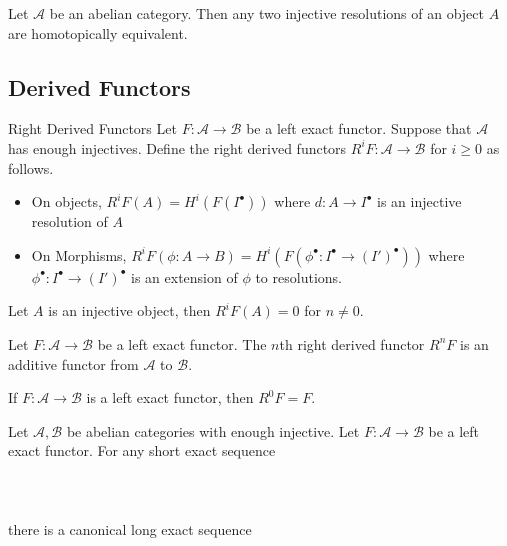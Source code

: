 \documentclass[a4paper]{article}
\begin{document}
\begin{lmm}{}{} Let $\mathcal{A}$ be an abelian category. Then any two injective resolutions of an object $A$ are homotopically equivalent. 
\end{lmm}

\subsection{Derived Functors}
\begin{defn}{Right Derived Functors}{} Let $F:\mathcal{A}\to\mathcal{B}$ be a left exact functor. Suppose that $\mathcal{A}$ has enough injectives. Define the right derived functors $R^iF:\mathcal{A}\to\mathcal{B}$ for $i\geq 0$ as follows. 
\begin{itemize}
\item On objects, $R^iF(A)=H^i(F(I^\bullet))$ where $d:A\to I^\bullet$ is an injective resolution of $A$
\item On Morphisms, $R^iF(\phi:A\to B)=H^i(F(\phi^\bullet:I^\bullet\to (I')^\bullet))$ where $\phi^\bullet:I^\bullet\to(I')^\bullet$ is an extension of $\phi$ to resolutions. 
\end{itemize}
\end{defn}

\begin{lmm}{}{} Let $A$ is an injective object, then $R^iF(A)=0$ for $n\neq 0$. 
\end{lmm}

\begin{thm}{}{} Let $F:\mathcal{A}\to\mathcal{B}$ be a left exact functor. The $n$th right derived functor $R^nF$ is an additive functor from $\mathcal{A}$ to $\mathcal{B}$. 
\end{thm}

\begin{crl}{}{} If $F:\mathcal{A}\to\mathcal{B}$ is a left exact functor, then $R^0F=F$. 
\end{crl}

\begin{thm}{}{} Let $\mathcal{A},\mathcal{B}$ be abelian categories with enough injective. Let $F:\mathcal{A}\to\mathcal{B}$ be a left exact functor. For any short exact sequence \\~\\
\\~\\
there is a canonical long exact sequence \\~\\
\\~\\
\end{thm}
\end{document}
